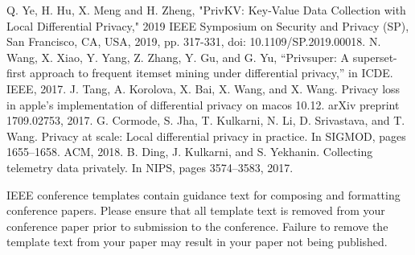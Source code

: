 \documentclass[conference]{IEEEtran}
\begin{document}
\begin{thebibliography}{00}
 Q. Ye, H. Hu, X. Meng and H. Zheng, "PrivKV: Key-Value Data Collection with Local Differential Privacy," 2019 IEEE Symposium on Security and Privacy (SP), San Francisco, CA, USA, 2019, pp. 317-331, doi: 10.1109/SP.2019.00018.
 N. Wang, X. Xiao, Y. Yang, Z. Zhang, Y. Gu, and G. Yu, “Privsuper:
A superset-first approach to frequent itemset mining under differential privacy,” in ICDE. IEEE, 2017.
 J. Tang, A. Korolova, X. Bai, X. Wang, and X. Wang. Privacy loss in
apple’s implementation of differential privacy on macos 10.12. arXiv preprint 1709.02753, 2017.
\bibitem{} G. Cormode, S. Jha, T. Kulkarni, N. Li, D. Srivastava, and T. Wang.
Privacy at scale: Local differential privacy in practice. In SIGMOD, pages 1655–1658. ACM, 2018.
\bibitem{} B. Ding, J. Kulkarni, and S. Yekhanin. Collecting telemetry data privately. In NIPS, pages 3574–3583, 2017.


\end{thebibliography}
\vspace{12pt}
\color{red}
IEEE conference templates contain guidance text for composing and formatting conference papers. Please ensure that all template text is removed from your conference paper prior to submission to the conference. Failure to remove the template text from your paper may result in your paper not being published.
\end{document}
